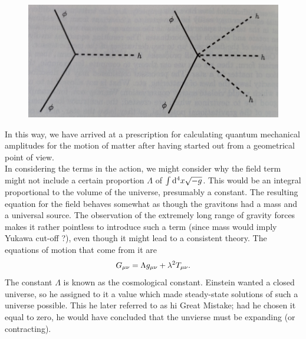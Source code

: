 \begin{figure}[h!]
	\centering
	\includegraphics[width=0.7\linewidth]{gfx/feynmanquantumgravity}
	\caption{}
	\label{fig:feynmanquantumgravity}
\end{figure}
In this way, we have arrived at a prescription for calculating quantum mechanical amplitudes for the motion of matter after having started out from a geometrical point of view.\\
In considering the terms in the action, we might consider why the field term might not include a certain proportion $\Lambda$ of $\int \mathrm{d}^4 x \sqrt{-g}$. This would be an integral proportional to the volume of the universe, presumably a constant. The resulting equation for the field behaves somewhat as though the gravitons had a mass and a universal source. The observation of the extremely long range of gravity forces makes it rather pointless to introduce such a term (since mass would imply Yukawa cut-off ?), even though it might lead to a consistent theory. The equations of motion that come from it are
\begin{equation}
G_{\mu \nu} = \Lambda g_{\mu \nu} + \lambda^2 T_{\mu \nu}.
\end{equation}
The constant $\Lambda$ is known as the cosmological constant. Einstein wanted a closed universe, so he assigned to it a value which made steady-state solutions of such a universe possible. This he later referred to as hi Great Mistake; had he chosen it equal to zero, he would have concluded that the unvierse must be expanding (or contracting). 























\newpage
